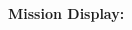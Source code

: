 \documentclass{article}
\begin{document}
\textbf{\ttfamily Mission Display:}

\begin{adjustbox}{center}
    
\end{adjustbox}
\end{document}

